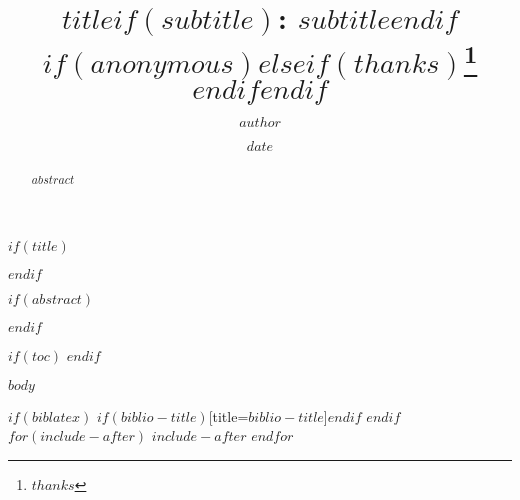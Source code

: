\documentclass{article}
\title{$title$$if(subtitle)$: $subtitle$$endif$ $if(anonymous)$$else$$if(thanks)$\thanks{$thanks$} $endif$$endif$ }
\author{$author$}
\date{$date$}
\begin{document}
$if(title)$
\maketitle
$endif$

$if(abstract)$

\begin{abstract}
$abstract$
\end{abstract}

$endif$

$if(toc)$
{
\tableofcontents
}
$endif$

$body$

$if(biblatex)$
\printbibliography$if(biblio-title)$[title=$biblio-title$]$endif$
$endif$
$for(include-after)$
$include-after$
$endfor$
\end{document}
